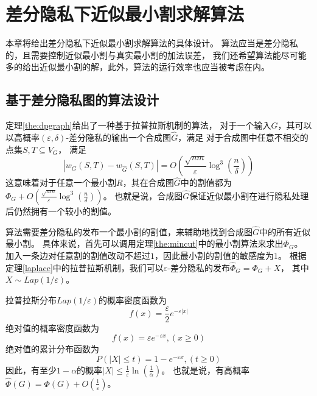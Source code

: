 \chapter{差分隐私下近似最小割求解算法}

本章将给出差分隐私下近似最小割求解算法的具体设计。
算法应当是差分隐私的，且需要控制近似最小割与真实最小割的加法误差，
我们还希望算法能尽可能多的给出近似最小割的解，此外，算法的运行效率也应当被考虑在内。

\section{基于差分隐私图的算法设计}

定理\ref{the:dpgraph}给出了一种基于拉普拉斯机制的算法，
对于一个输入$G$，其可以以高概率$(\varepsilon,\delta)$-差分隐私的输出一个合成图$\hat G$，满足
对于合成图中任意不相交的点集$ S, T \subseteq V_G $，
    满足
    \begin{equation*}
        |w_G(S, T) - w_{\hat{G}}(S, T)| = O\left(\frac{\sqrt{nm}}{\varepsilon} \log^3 \left(\frac{n}{\delta}\right)\right)   
    \end{equation*}
这意味着对于任意一个最小割$R$，其在合成图$\hat G$中的割值都为$\Phi_G+ O\left(\frac{\sqrt{nm}}{\varepsilon} \log^3 \left(\frac{n}{\delta}\right)\right)$。
也就是说，合成图$\hat G$保证近似最小割在进行隐私处理后仍然拥有一个较小的割值。

算法需要差分隐私的发布一个最小割的割值，来辅助地找到合成图$\hat G$中的所有近似最小割。
具体来说，首先可以调用定理\ref{the:mincut}中的最小割算法来求出$\Phi_G$。
加入一条边对任意割的割值改动不超过$1$，因此最小割的割值的敏感度为$1$。
根据定理\ref{laplace}中的拉普拉斯机制，我们可以$\varepsilon$-差分隐私的发布$\hat \Phi_G=\Phi_G+X$，
其中$X\sim Lap(1/\varepsilon)$。

拉普拉斯分布$Lap(1/\varepsilon)$的概率密度函数为
\begin{equation*}
    f(x)=\frac \varepsilon{2} e^{-\varepsilon|x|}
\end{equation*}
绝对值的概率密度函数为
\begin{equation*}
    f(x)=\varepsilon e^{-\varepsilon x},(x\geq 0)
\end{equation*}
绝对值的累计分布函数为
\begin{equation*}
    P(|X|\leq t)=1-e^{-\varepsilon x},(t\geq 0)
\end{equation*}
因此，有至少$1-\alpha$的概率$|X|\leq \frac1\varepsilon\ln\left(\frac1\alpha\right)$。
也就是说，有高概率$\hat\Phi(G)=\Phi(G)+O(\frac1\varepsilon)$。

